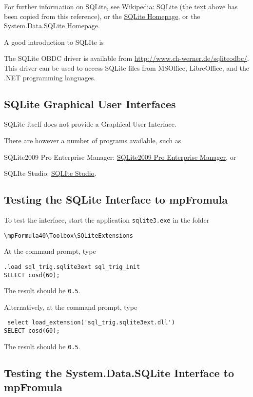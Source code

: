 \vpara
For further information on SQLite, see \href{http://en.wikipedia.org/wiki/SQLite}{Wikipedia: SQLite} (the text above has been copied from this reference), or the  \href{http://sqlite.org/}{SQLite Homepage}, or the  \href{http://system.data.sqlite.org/index.html/doc/trunk/www/index.wiki}{System.Data.SQLite Homepage}.

\vpara
A good introduction to SQLIte is \cite{Kreibich2010}

\vpara
The SQLite OBDC driver is available from  \href{http://www.ch-werner.de/sqliteodbc/}{http://www.ch-werner.de/sqliteodbc/}. This driver can be used to access SQLite files from MSOffice, LibreOffice, and the .NET programming languages.


\subsection{SQLite Graphical User Interfaces}
SQLite itself does not provide a Graphical User Interface. 

There are however a number of programs available, such as

SQLite2009 Pro Enterprise Manager: \href{http://osenxpsuite.net/download.htm}{SQLite2009 Pro Enterprise Manager}, or

SQLIte Studio:  \href{http://sqlitestudio.pl/}{SQLIte Studio}.


\subsection{Testing the SQLite Interface to mpFromula}

To test the interface, start the application \verb|sqlite3.exe| in the folder

\verb|\mpFormula40\Toolbox\SQLiteExtensions|

\vpara
At the command prompt, type
\begin{verbatim}
.load sql_trig.sqlite3ext sql_trig_init
SELECT cosd(60);
\end{verbatim}
The result should be \verb|0.5|.


Alternatively, at the command prompt, type
\begin{verbatim}
 select load_extension('sql_trig.sqlite3ext.dll')
SELECT cosd(60);
\end{verbatim}
The result should be \verb|0.5|.


\subsection{Testing the System.Data.SQLite Interface to mpFromula}

